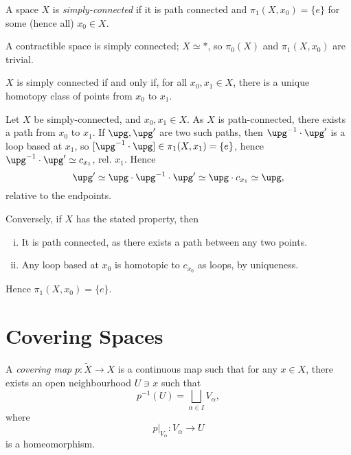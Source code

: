 \documentclass[12pt]{article}
\begin{document}
\begin{definition}
	A space $X$ is \emph{simply-connected} if it is path connected and $\pi_1(X, x_0) = \{e\}$ for some (hence all) $x_0 \in X$.
\end{definition}

\begin{exbox}
	A contractible space is simply connected; $X \simeq \ast$, so $\pi_0(X)$ and $\pi_1(X, x_0)$ are trivial.
\end{exbox}

\begin{lemma}
	$X$ is simply connected if and only if, for all $x_0, x_1 \in X$, there is a unique homotopy class of points from $x_0$ to $x_1$.
\end{lemma}

\begin{proofbox}
	Let $X$ be simply-connected, and $x_0, x_1 \in X$. As $X$ is path-connected, there exists a path from $x_0$ to $x_1$. If $\upg, \upg'$ are two such paths, then $\upg^{-1} \cdot \upg'$ is a loop based at $x_1$, so $[\upg^{-1} \cdot \upg] \in \pi_1(X, x_1) = \{e\}$, hence $\upg^{-1} \cdot \upg' \simeq c_{x_1}$, rel. $x_1$. Hence 
	\[
	\upg' \simeq \upg \cdot \upg^{-1} \cdot \upg' \simeq \upg \cdot c_{x_1} \simeq \upg,
	\]
	relative to the endpoints.

	Conversely, if $X$ has the stated property, then
	\begin{enumerate}[(i)]
		\item It is path connected, as there exists a path between any two points.
		\item Any loop based at $x_0$ is homotopic to $c_{x_0}$ as loops, by uniqueness.
	\end{enumerate}
	Hence $\pi_1(X, x_0) = \{e\}$.
\end{proofbox}

\newpage

\section{Covering Spaces}
\label{sec:cov_spac}

\begin{definition}
	A \emph{covering map} $p : \tilde X \to X$ is a continuous map such that for any $x \in X$, there exists an open neighbourhood $U \ni x$ such that
	\[
	p^{-1}(U) = \bigsqcup_{\alpha \in I} V_\alpha,
	\]
	where
	\[
	p|_{V_\alpha} : V_{\alpha} \to U
	\]
	is a homeomorphism.
\end{definition}
\end{document}
